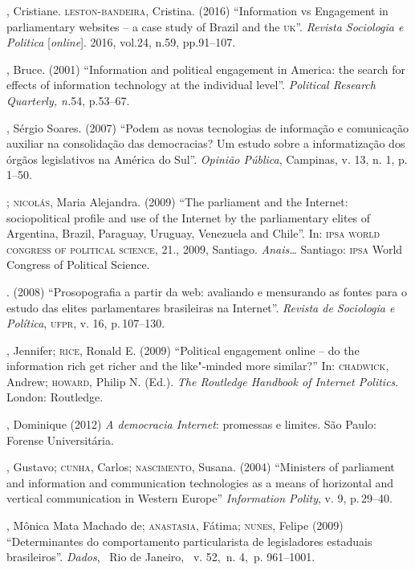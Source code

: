 \begin{bibliohedra}
, Cristiane. \textsc{leston}-\textsc{bandeira}, Cristina. (2016) ``Information vs
Engagement in parliamentary websites -- a case study of Brazil and the
\textsc{uk}''. \emph{Revista Sociologia e Politica} {[}\emph{online}{]}. 2016, vol.24,
n.59, pp.91--107.

, Bruce. (2001) ``Information and political engagement in America:
the search for effects of information technology at the individual
level''. \emph{Political Research Quarterly, n.}54, p.53--67.

, Sérgio Soares. (2007) ``Podem as novas tecnologias de informação
e comunicação auxiliar na consolidação das democracias? Um estudo sobre
a informatização dos órgãos legislativos na América do Sul''.
\emph{Opinião Pública}, Campinas, v. 13, n. 1, p.\,1--50.

\titidem; \textsc{nicolás}, Maria Alejandra. (2009) ``The parliament and the
Internet: sociopolitical profile and use of the Internet by the
parliamentary elites of Argentina, Brazil, Paraguay, Uruguay, Venezuela
and Chile''. In: \textsc{ipsa world congress of political science}, 21., 2009,
Santiago. \emph{Anais\ldots{}} Santiago: \textsc{ipsa} World Congress of Political
Science.

\titidem. (2008) ``Prosopografia a partir
da web: avaliando e mensurando as fontes para o estudo das elites
parlamentares brasileiras na Internet''. \emph{Revista de Sociologia e
Política}, \textsc{ufpr}, v. 16, p.\,107--130.

, Jennifer; \textsc{rice}, Ronald E. (2009) ``Political engagement
online -- do the information rich get richer and the like"-minded more
similar?'' In: \textsc{chadwick}, Andrew; \textsc{howard}, Philip N. (Ed.). \emph{The
Routledge Handbook of Internet Politics}. London: Routledge.

, Dominique (2012) \emph{A democracia Internet}: promessas e
limites. São Paulo: Forense Universitária.

, Gustavo; \textsc{cunha}, Carlos; \textsc{nascimento}, Susana. (2004) ``Ministers
of parliament and information and communication technologies as a means
of horizontal and vertical communication in Western Europe''
\emph{Information Polity}, v. 9, p.\,29--40.

, Mônica Mata Machado de; \textsc{anastasia}, Fátima; \textsc{nunes}, Felipe (2009)
``Determinantes do comportamento particularista de legisladores
estaduais brasileiros''. \emph{Dados},~ Rio de Janeiro,~ v. 52,~n. 4,~p.
961--1001.


\end{bibliohedra}
